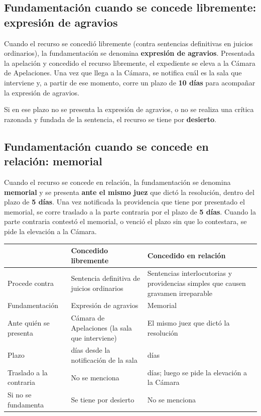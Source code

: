 \documentclass[12pt,oneside]{book}
\begin{document}
\subsection{Fundamentaci\'on cuando se concede libremente: expresi\'on de agravios}

Cuando el recurso se concedi\'o libremente (contra sentencias definitivas en juicios ordinarios), la fundamentaci\'on se denomina \textbf{expresi\'on de agravios}. Presentada la apelaci\'on y concedido el recurso libremente, el expediente se eleva a la C\'amara de Apelaciones. Una vez que llega a la C\'amara, se notifica cu\'al es la sala que interviene y, a partir de ese momento, corre un plazo de \textbf{10 d\'ias} para acompa\~nar la expresi\'on de agravios.

Si en ese plazo no se presenta la expresi\'on de agravios, o no se realiza una cr\'itica razonada y fundada de la sentencia, el recurso se tiene por \textbf{desierto}.

\subsection{Fundamentaci\'on cuando se concede en relaci\'on: memorial}

Cuando el recurso se concede en relaci\'on, la fundamentaci\'on se denomina \textbf{memorial} y se presenta \textbf{ante el mismo juez} que dict\'o la resoluci\'on, dentro del plazo de \textbf{5 d\'ias}. Una vez notificada la providencia que tiene por presentado el memorial, se corre traslado a la parte contraria por el plazo de \textbf{5 d\'ias}. Cuando la parte contraria contest\'o el memorial, o venci\'o el plazo sin que lo contestara, se pide la elevaci\'on a la C\'amara.

\begin{table}[H]
\centering
\renewcommand{\arraystretch}{1.3}
\begin{tabularx}{\textwidth}{
    >{\raggedright\arraybackslash}p{}
    >{\raggedright\arraybackslash}X
    >{\raggedright\arraybackslash}X
}
\toprule
 & \textbf{Concedido libremente} & \textbf{Concedido en relaci\'on} \\
\midrule
Procede contra & Sentencia definitiva de juicios ordinarios & Sentencias interlocutorias y providencias simples que causen gravamen irreparable \\
Fundamentaci\'on & Expresi\'on de agravios & Memorial \\
Ante qui\'en se presenta & C\'amara de Apelaciones (la sala que interviene) & El mismo juez que dict\'o la resoluci\'on \\
Plazo & 10 d\'ias desde la notificaci\'on de la sala & 5 d\'ias \\
Traslado a la contraria & No se menciona & 5 d\'ias; luego se pide la elevaci\'on a la C\'amara \\
Si no se fundamenta & Se tiene por desierto & No se menciona \\
\bottomrule
\end{tabularx}
\end{table}
\end{document}
